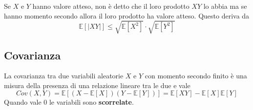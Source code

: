 \begin{proposition}
	Se $X$ e $Y$ hanno valore atteso, non è detto che il loro prodotto $XY$ lo abbia ma se hanno momento secondo allora il loro prodotto ha valore atteso. Questo deriva da
	\begin{equation}
		\mathbb{E}[\lvert XY \rvert] \leq \sqrt{\mathbb{E}[X^2]} \cdot \sqrt{\mathbb{E}[Y^2]}
	\end{equation}
\end{proposition}

\subsection{Covarianza}
\begin{definition}[Covarianza]
	La covarianza tra due variabili aleatorie $X$ e $Y$ con momento secondo finito è una misura della presenza di una relazione lineare tra le due e vale
	\begin{equation}
		Cov(X,Y) = \mathbb{E}[(X - \mathbb{E}[X])(Y-\mathbb{E}[Y])] = \mathbb{E}[XY] - \mathbb{E}[X]\mathbb{E}[Y]
	\end{equation}
	Quando vale $0$ le variabili sono \textbf{scorrelate}.
\end{definition}